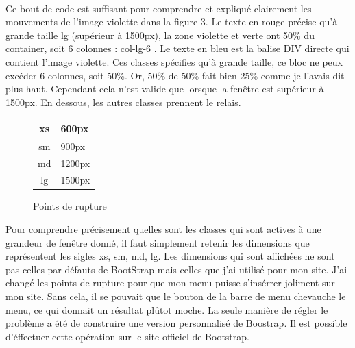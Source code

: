 \documentclass{article}
\begin{document}
\vspace{0.5cm}\\
Ce bout de code est suffisant pour comprendre et expliqu\'e clairement les mouvements de l'image violette dans la figure 3. Le texte en rouge pr\'ecise qu'\`a grande taille lg (sup\'erieur \`a 1500px), la zone violette et verte ont 50\% du container, soit 6 colonnes : \og col-lg-6 \fg{} . Le texte en bleu est la balise DIV directe qui contient l'image violette. Ces classes sp\'ecifies qu'\`a grande taille, ce bloc ne peux exc\'eder 6 colonnes, soit 50\%. Or, 50\% de 50\% fait bien 25\% comme je l'avais dit plus haut. Cependant cela n'est valide que lorsque la fen\^etre est sup\'erieur \`a 1500px. En dessous, les autres classes prennent le relais.\\ 

\begin{figure}
  \vspace{-20pt}
  \begin{center}
    \begin{tabular*}{0.48\textwidth}{@{\extracolsep{\fill}} | c | l | }
  \hline
  xs & 600px\\
  \hline
  sm & 900px\\
  \hline
  md & 1200px\\
  \hline
  lg & 1500px\\
  \hline
\end{tabular*}
  \end{center}
  \vspace{-20pt}
  \caption{Points de rupture}
  \vspace{-10pt}
\end{figure} 

Pour comprendre pr\'ecisement quelles sont les classes qui sont actives \`a une grandeur de fen\^etre donn\'e, il faut simplement retenir les dimensions que repr\'esentent les sigles xs, sm, md, lg. Les dimensions qui sont affich\'ees ne sont pas celles par d\'efauts de BootStrap mais celles que j'ai utilis\'e pour mon site. J'ai chang\'e les points de rupture pour que mon menu puisse s'ins\'errer joliment sur mon site. Sans cela, il se pouvait que le bouton de la barre de menu chevauche le menu, ce qui donnait un r\'esultat pl\^utot moche. La seule mani\`ere de r\'egler le probl\`eme a \'et\'e de construire une version personnalis\'e de Boostrap. Il est possible d'\'effectuer cette op\'eration sur le site officiel de Bootstrap.\\
\end{document}
